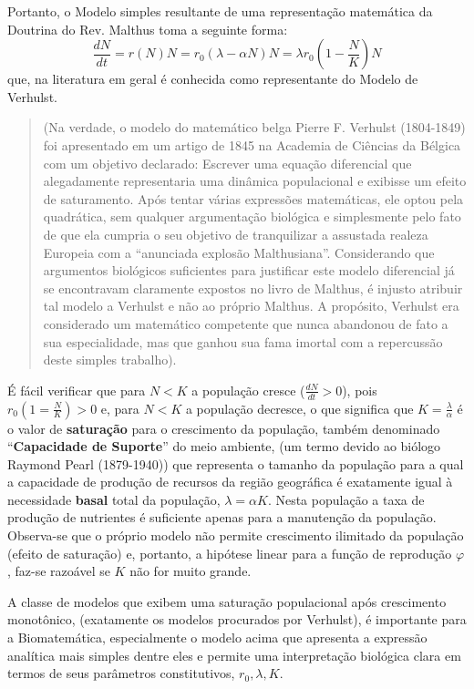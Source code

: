     Portanto, o Modelo simples resultante de uma representação matemática da Doutrina do Rev. Malthus toma a seguinte forma:
    \[\dfrac{dN}{dt} = r(N) N = r_0 (\lambda - \alpha N) N = \lambda r_0 \left(1 - \dfrac{N}{K}\right)N\]
    que, na literatura em geral é conhecida como representante do Modelo de Verhulst.

\begin{quotation}
    (Na verdade, o modelo do matemático belga Pierre F. Verhulst (1804-1849) foi apresentado em um artigo de 1845 na Academia de Ciências da Bélgica com um objetivo declarado: Escrever uma equação diferencial que alegadamente representaria uma dinâmica populacional e exibisse um efeito de saturamento. Após tentar várias expressões matemáticas, ele optou pela quadrática, sem qualquer argumentação biológica e simplesmente pelo fato de que ela cumpria o seu objetivo de tranquilizar a assustada realeza Europeia com a ``anunciada explosão Malthusiana''. Considerando que argumentos biológicos suficientes para justificar este modelo diferencial já se encontravam claramente expostos no livro de Malthus, é injusto atribuir tal modelo a Verhulst e não ao próprio Malthus. A propósito, Verhulst era considerado um matemático competente que nunca abandonou de fato a sua especialidade, mas que ganhou sua fama imortal com a repercussão deste simples trabalho).
\end{quotation}

    É fácil verificar que para \(N < K\) a população cresce (\(\frac{dN}{dt} > 0\)), pois \(r_0 (1=\frac{N}{K}) > 0\) e, para \(N < K\) a população decresce, o que significa que \(K = \frac{\lambda}{\alpha}\) é o valor de \textbf{saturação} para o crescimento da população, também denominado ``\textbf{Capacidade de Suporte}'' do meio ambiente, (um termo devido ao biólogo Raymond Pearl (1879-1940)) que representa o tamanho da população para a qual a capacidade de produção de recursos da região geográfica é exatamente igual à necessidade \textbf{basal} total da população, \(\lambda = \alpha K\). Nesta população a taxa de produção de nutrientes é suficiente apenas para a manutenção da população. Observa-se que o próprio modelo não permite crescimento ilimitado da população (efeito de saturação) e, portanto, a hipótese linear para a função de reprodução \(\varphi\), faz-se razoável se \(K\) não for muito grande.

    A classe de modelos que exibem uma saturação populacional após crescimento monotônico, (exatamente os modelos procurados por Verhulst), é importante para a Biomatemática, especialmente o modelo acima que apresenta a expressão analítica mais simples dentre eles e permite uma interpretação biológica clara em termos de seus parâmetros constitutivos, \(r_0, \lambda, K\).

